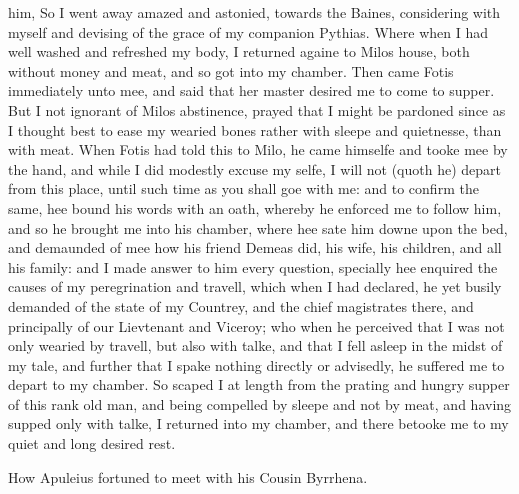 him, So I went away amazed and astonied, towards the Baines, considering with
myself and devising of the grace of my companion Pythias. Where when I had well
washed and refreshed my body, I returned againe to Milos house, both without
money and meat, and so got into my chamber. Then came Fotis immediately unto
mee, and said that her master desired me to come to supper. But I not ignorant
of Milos abstinence, prayed that I might be pardoned since as I thought best to
ease my wearied bones rather with sleepe and quietnesse, than with meat. When
Fotis had told this to Milo, he came himselfe and tooke mee by the hand, and
while I did modestly excuse my selfe, I will not (quoth he) depart from this
place, until such time as you shall goe with me: and to confirm the same, hee
bound his words with an oath, whereby he enforced me to follow him, and so he
brought me into his chamber, where hee sate him downe upon the bed, and
demaunded of mee how his friend Demeas did, his wife, his children, and all his
family: and I made answer to him every question, specially hee enquired the
causes of my peregrination and travell, which when I had declared, he yet
busily demanded of the state of my Countrey, and the chief magistrates there,
and principally of our Lievtenant and Viceroy; who when he perceived that I was
not only wearied by travell, but also with talke, and that I fell asleep in the
midst of my tale, and further that I spake nothing directly or advisedly, he
suffered me to depart to my chamber. So scaped I at length from the prating and
hungry supper of this rank old man, and being compelled by sleepe and not by
meat, and having supped only with talke, I returned into my chamber, and there
betooke me to my quiet and long desired rest.



How Apuleius fortuned to meet with his Cousin Byrrhena.


